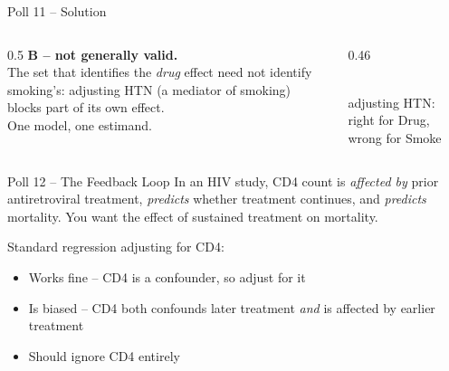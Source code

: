 \documentclass[aspectratio=169]{beamer}
\begin{document}
\begin{frame}{Poll 11 \;--\; Solution}
  \small
  \begin{columns}[T]
    \begin{column}{0.5\textwidth}
      \textcolor{good}{\textbf{B -- not generally valid.}}\\[0.4em]
      The set that identifies the \emph{drug} effect need not identify
      smoking's: adjusting HTN (a mediator of smoking) blocks part of its own
      effect.\\[0.2em]
      One model, one estimand.
    \end{column}
    \begin{column}{0.46\textwidth}
      \centering
      \\[0.2em]
      {\scriptsize adjusting HTN: right for Drug, wrong for Smoke}
    \end{column}
  \end{columns}
\end{frame}

\begin{frame}{Poll 12 \;--\; The Feedback Loop}
  \small
  In an HIV study, CD4 count is \emph{affected by} prior antiretroviral
  treatment, \emph{predicts} whether treatment continues, and \emph{predicts}
  mortality. You want the effect of sustained treatment on mortality.
  \vspace{0.8em}

  Standard regression adjusting for CD4:
  \begin{itemize}
    \item[\textbf{A.}] Works fine -- CD4 is a confounder, so adjust for it
    \item[\textbf{B.}] Is biased -- CD4 both confounds later treatment \emph{and} is affected by earlier treatment
    \item[\textbf{C.}] Should ignore CD4 entirely
  \end{itemize}
\end{frame}
\end{document}
